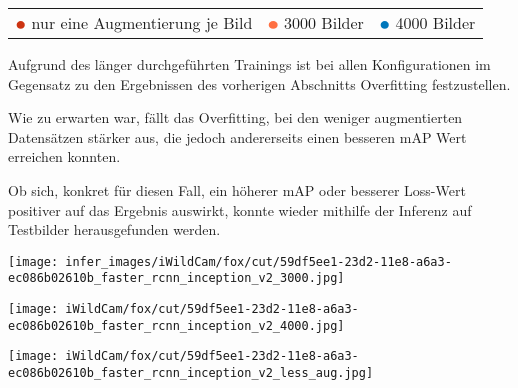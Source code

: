 \begin{table}[htb]
  \centering
  \begin{tabular}{ m{}<{\centering}
                   m{}<{\centering}
                   m{}<{\centering}}
      $\color[HTML]{CC3311}\medbullet$ nur eine Augmentierung je Bild &
      $\color[HTML]{FF7043}\medbullet$  3000 Bilder &
      $\color[HTML]{0077BB}\medbullet$  4000 Bilder
  \end{tabular}    
\end{table}
\vspace{1cm}

Aufgrund des länger durchgeführten Trainings
ist bei allen Konfigurationen im Gegensatz zu den
Ergebnissen des vorherigen Abschnitts Overfitting 
festzustellen.

Wie zu erwarten war, fällt das Overfitting, bei den weniger  
augmentierten Datensätzen stärker aus, die jedoch andererseits
einen besseren mAP Wert erreichen konnten.


Ob sich, konkret für diesen Fall, ein höherer mAP oder 
besserer Loss-Wert positiver auf das Ergebnis auswirkt,
konnte wieder mithilfe der Inferenz auf Testbilder 
herausgefunden werden.
\vspace{1cm}

\begin{minipage}{0.333\textwidth}
  \centering
  \texttt{[image: infer\_images/iWildCam/fox/cut/59df5ee1-23d2-11e8-a6a3-ec086b02610b\_faster\_rcnn\_inception\_v2\_3000.jpg]}
  \label{fig:infer_res_3000}
\end{minipage}
\begin{minipage}{0.333\textwidth}
  \centering
  \label{fig:infer_res_4000}
  \texttt{[image: iWildCam/fox/cut/59df5ee1-23d2-11e8-a6a3-ec086b02610b\_faster\_rcnn\_inception\_v2\_4000.jpg]}
\end{minipage}
\begin{minipage}{0.333\textwidth}
  \centering
  \texttt{[image: iWildCam/fox/cut/59df5ee1-23d2-11e8-a6a3-ec086b02610b\_faster\_rcnn\_inception\_v2\_less\_aug.jpg]}
  \label{fig:infer_rest_05}
\end{minipage}
\vspace{1cm}

